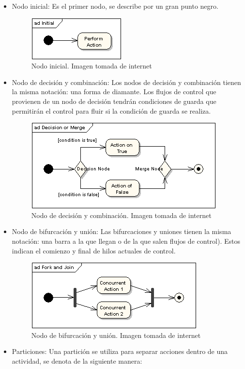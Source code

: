\begin{itemize}
\begin{figure}[H]
\end{figure}
\item Nodo inicial: Es el primer nodo, se describe por un gran punto negro.
\begin{figure}[H]
	\centering
	\includegraphics[width=0.5\linewidth]{diseno/actividades/imgs/6}
	\caption{Nodo inicial. Imagen tomada de internet}
	\label{fig:gantt}
\end{figure}
\item Nodo de decisión y combinación: Los nodos de decisión y combinación tienen la misma notación: una forma de diamante.  Los flujos de control que provienen de un nodo de decisión tendrán condiciones de guarda que permitirán el control para fluir si la condición de guarda se realiza.
\begin{figure}[H]
	\centering
	\includegraphics[width=0.5\linewidth]{diseno/actividades/imgs/4}
	\caption{Nodo de decisión y combinación. Imagen tomada de internet}
	\label{fig:gantt}
\end{figure}
\item Nodo de bifurcación y unión: Las bifurcaciones y uniones tienen la misma notación: una barra a la que llegan o de la que salen flujos de control). Estos indican el comienzo y final de hilos actuales de control.
\begin{figure}[H]
	\centering
	\includegraphics[width=0.5\linewidth]{diseno/actividades/imgs/5}
	\caption{Nodo de bifurcación y unión. Imagen tomada de internet}
	\label{fig:gantt}
\end{figure}
\item Particiones: 	Una partición se utiliza para separar acciones dentro de una actividad, se denota de la siguiente manera:

\end{itemize}
